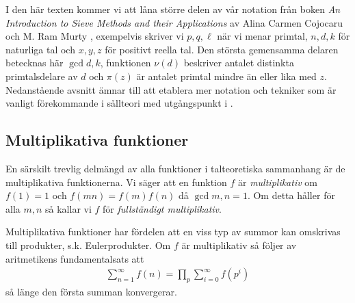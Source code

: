 
I den här texten kommer vi att låna större delen av vår notation från boken \textit{An Introduction to Sieve Methods and their Applications} av Alina Carmen Cojocaru och M. Ram Murty \cite{cojocarumurty}, exempelvis skriver vi \(p, q, \ell\) när vi menar primtal, \(n, d, k\) för naturliga tal och \(x, y, z\) för positivt reella tal. Den största gemensamma delaren betecknas här \(\gcd{d, k}\), funktionen \(\nu(d)\) beskriver antalet distinkta primtalsdelare av \(d\) och \(\pi(z)\) är antalet primtal mindre än eller lika med \(z\). Nedanstående avsnitt ämnar till att etablera mer notation och tekniker som är vanligt förekommande i sållteori med utgångspunkt i \cite{cojocarumurty}.

\subsection{Multiplikativa funktioner} \label{mult}
En särskilt trevlig delmängd av alla funktioner i talteoretiska sammanhang är de multiplikativa funktionerna. Vi säger att en funktion $f$ är \textit{multiplikativ} om $f(1) = 1$ och \(f(mn) = f(m)f(n)\) då $\gcd{m,n} = 1$. Om detta håller för alla $m, n$ så kallar vi $f$ för \textit{fullständigt multiplikativ}. 

Multiplikativa funktioner har fördelen att en viss typ av summor kan omskrivas till produkter, s.k. Eulerprodukter. Om \(f\) är multiplikativ så följer av aritmetikens fundamentalsats att
\begin{align*}
    \sum_{n = 1}^\infty f(n) = \prod_p \sum_{i=0}^\infty f(p^i)
\end{align*}
så länge den första summan konvergerar. 

